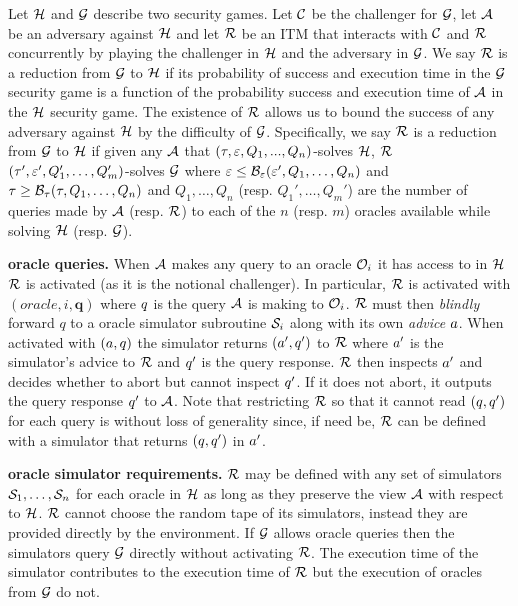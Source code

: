 \begin{definition}
  \label{security-reduction}
  Let $\mathcal{H}$ and $\mathcal{G}$ describe two security games.
  Let $\mathcal{C}$ be the challenger for $\mathcal{G}$, let $\mathcal{A}$ be an adversary against $\mathcal{H}$ and let $\mathcal{R}$ be an ITM that interacts with $\mathcal{C}$ and $\mathcal{R}$ concurrently by playing the challenger in $\mathcal{H}$ and the adversary in $\mathcal{G}$.
  We say $\mathcal{R}$ is a reduction from $\mathcal{G}$ to $\mathcal{H}$ if its probability of success and execution time in the $\mathcal{G}$ security game is a function of the probability success and execution time of $\mathcal{A}$ in the $\mathcal{H}$ security game.
  The existence of $\mathcal{R}$ allows us to bound the success of any adversary against $\mathcal{H}$ by the difficulty of $\mathcal{G}$.
  Specifically, we say $\mathcal{R}$ is a reduction from $\mathcal{G}$ to $\mathcal{H}$ if given any $\mathcal{A}$ that $(\tau, \varepsilon, Q_1,...,Q_n)$-solves $\mathcal{H}$, $\mathcal{R}$ $(\tau', \varepsilon', Q_1',\dots,Q_m')$-solves $\mathcal{G}$ where $\varepsilon \leq \mathcal{B}_\varepsilon(\varepsilon', Q_1,\dots,Q_n) $ and $\tau \geq \mathcal{B}_\tau(\tau, Q_1,\dots,Q_n)$ and $Q_1,\dots,Q_n$ (resp. $Q_1', \dots, Q_m'$) are the number of queries made by $\mathcal{A}$ (resp. $\mathcal{R}$) to each of the $n$ (resp. $m$) oracles available while solving $\mathcal{H}$ (resp. $\mathcal{G}$).

  \textbf{oracle queries.} When $\mathcal{A}$ makes any query to an oracle $\mathcal{O}_i$ it has access to in $\mathcal{H}$ $\mathcal{R}$ is activated (as it is the notional challenger).
  In particular, $\mathcal{R}$ is activated with $(\mathit{oracle}, i,\mathbf{q})$ where $q$ is the query $\mathcal{A}$ is making to $\mathcal{O}_i$.
  $\mathcal{R}$ must then \emph{blindly} forward $q$ to a oracle simulator subroutine $\mathcal{S}_i$ along with its own \emph{advice} $a$.
  When activated with $(a, q)$ the simulator returns $(a', q')$ to $\mathcal{R}$ where $a'$ is the simulator's advice to $\mathcal{R}$ and $q'$ is the query response.
  $\mathcal{R}$ then inspects $a'$ and decides whether to abort but cannot inspect $q'$.
  If it does not abort, it outputs the query response $q'$ to $\mathcal{A}$.
  Note that restricting $\mathcal{R}$ so that it cannot read $(q, q')$ for each query is without loss of generality since, if need be, $\mathcal{R}$ can be defined with a simulator that returns $(q,q')$ in $a'$.

  \textbf{oracle simulator requirements.} $\mathcal{R}$ may be defined with any set of simulators $\mathcal{S}_1,\dots,\mathcal{S}_n$ for each oracle in $\mathcal{H}$ as long as they preserve the view $\mathcal{A}$ with respect to $\mathcal{H}$.
  $\mathcal{R}$ cannot choose the random tape of its simulators, instead they are provided directly by the environment.
  If $\mathcal{G}$ allows oracle queries then the simulators query $\mathcal{G}$ directly without activating $\mathcal{R}$.
  The execution time of the simulator contributes to the execution time of $\mathcal{R}$ but the execution of oracles from $\mathcal{G}$ do not.


\end{definition}
